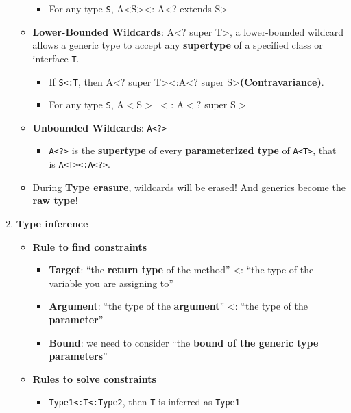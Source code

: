 \documentclass[10pt, landscape]{article}
\begin{document}
\begin{multicols}{4}
\begin{enumerate}
\begin{itemize}
\begin{itemize}
            \item For any type \texttt{S}, A\textless S\textgreater \textless: A\textless? extends S\textgreater
        \end{itemize}
        \item \textbf{Lower-Bounded Wildcards}: A\textless? super T\textgreater, a lower-bounded wildcard allows a generic type to accept any \textbf{supertype} of a specified class or interface \texttt{T}.
        \begin{itemize}
            \item If \texttt{S<:T}, then A\textless? super T\textgreater\textless:A\textless? super S\textgreater \textbf{(Contravariance)}.
            \item For any type \texttt{S}, A$<$S$>$ $<$: A$<$? super S$>$
        \end{itemize}
        \item \textbf{Unbounded Wildcards}: \texttt{A<?>}
        \begin{itemize}
            \item \texttt{A<?>} is the \textbf{supertype} of every \textbf{parameterized type} of \texttt{A<T>}, that is \texttt{A<T><:A<?>}.
        \end{itemize}
        \item During \textbf{Type erasure}, wildcards will be erased! And generics become the \textbf{raw type}!
    \end{itemize}
    \item \textbf{Type inference}
    \begin{itemize}
        \item \textbf{Rule to find constraints}
        \begin{itemize}
            \item \textbf{Target}: ``the \textbf{return type} of the method'' <: ``the type of the variable you are assigning to''
            \item \textbf{Argument}: ``the type of the \textbf{argument}'' <: ``the type of the \textbf{parameter}''
            \item \textbf{Bound}: we need to consider ``the \textbf{bound of the generic type parameters}''
        \end{itemize}
        \item \textbf{Rules to solve constraints}
        \begin{itemize}
            \item \texttt{Type1<:T<:Type2}, then \texttt{T} is inferred as \texttt{Type1}

\end{itemize}
\end{itemize}
\end{enumerate}
\end{multicols}
\end{document}
